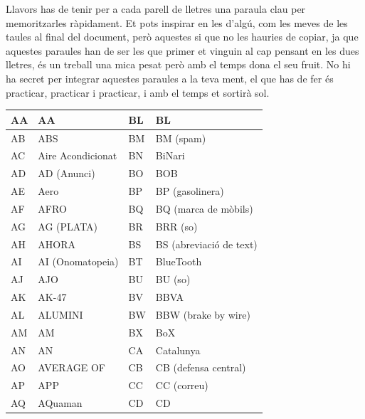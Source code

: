 Llavors has de tenir per a cada parell de lletres una paraula clau per memoritzarles ràpidament. Et pots inspirar en les d'algú, com les meves de les taules al final del document, però aquestes si que no les hauries de copiar, ja que aquestes paraules han de ser les que primer et vinguin al cap pensant en les dues lletres, és un treball una mica pesat però amb el temps dona el seu fruit.
No hi ha secret per integrar aquestes paraules a la teva ment, el que has de fer és practicar, practicar i practicar, i amb el temps et sortirà sol.

\begin{table}[ht]
    \centering
    \begin{tabular}{|l|l|l|l|}
        \hline
        AA & AA                 & BL & BL                      \\ \hline
        AB & ABS                & BM & BM (spam)               \\ \hline
        AC & Aire Acondicionat  & BN & BiNari                  \\ \hline
        AD & AD (Anunci)        & BO & BOB                     \\ \hline
        AE & Aero               & BP & BP (gasolinera)         \\ \hline
        AF & AFRO               & BQ & BQ (marca de mòbils)    \\ \hline
        AG & AG (PLATA)         & BR & BRR (so)                \\ \hline
        AH & AHORA              & BS & BS (abreviació de text) \\ \hline
        AI & AI (Onomatopeia)   & BT & BlueTooth               \\ \hline
        AJ & AJO                & BU & BU (so)                 \\ \hline
        AK & AK-47              & BV & BBVA                    \\ \hline
        AL & ALUMINI            & BW & BBW (brake by wire)     \\ \hline
        AM & AM                 & BX & BoX                     \\ \hline
        AN & AN                 & CA & Catalunya               \\ \hline
        AO & AVERAGE OF         & CB & CB (defensa central)    \\ \hline
        AP & APP                & CC & CC (correu)             \\ \hline
        AQ & AQuaman            & CD & CD                      \\ \hline

\end{tabular}
\end{table}
